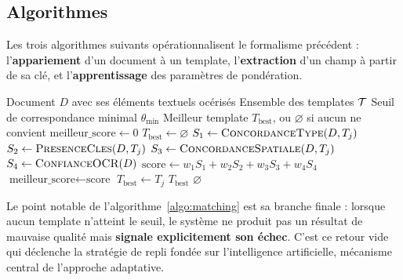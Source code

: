 \subsection{Algorithmes}
\label{subsec:algorithmes}

Les trois algorithmes suivants opérationnalisent le formalisme précédent :
l'\textbf{appariement} d'un document à un template, l'\textbf{extraction} d'un champ à partir
de sa clé, et l'\textbf{apprentissage} des paramètres de pondération.

\begin{algorithm}[H]
\caption{Appariement d'un document à un template}
\label{algo:matching}
\begin{opalgbox}
\opalgfont
\begin{algorithmic}[1]
\Require Document $D$ avec ses éléments textuels océrisés
\Require Ensemble des templates $\mathcal{T}$
\Require Seuil de correspondance minimal $\theta_{\min}$
\Ensure Meilleur template $T_{\text{best}}$, ou $\varnothing$ si aucun ne convient
  \State $\text{meilleur\_score} \gets 0$ 
  \State $T_{\text{best}} \gets \varnothing$
    \State $S_1 \gets \Call{ConcordanceType}{D, T_j}$ 
    \State $S_2 \gets \Call{PresenceCles}{D, T_j}$ 
    \State $S_3 \gets \Call{ConcordanceSpatiale}{D, T_j}$ 
    \State $S_4 \gets \Call{ConfianceOCR}{D}$ 
    \State $\text{score} \gets w_1 S_1 + w_2 S_2 + w_3 S_3 + w_4 S_4$ 
      \State $\text{meilleur\_score} \gets \text{score}$ 
      \State $T_{\text{best}} \gets T_j$
    \EndIf
  \EndFor
    \State \Return $T_{\text{best}}$ 
  \Else
    \State \Return $\varnothing$ 
  \EndIf
\EndProcedure
\end{algorithmic}
\end{opalgbox}
\end{algorithm}

Le point notable de l'algorithme~\ref{algo:matching} est sa branche finale : lorsque aucun
template n'atteint le seuil, le système ne produit pas un résultat de mauvaise qualité mais
\textbf{signale explicitement son échec}. C'est ce retour vide qui déclenche la stratégie de
repli fondée sur l'intelligence artificielle, mécanisme central de l'approche adaptative.

